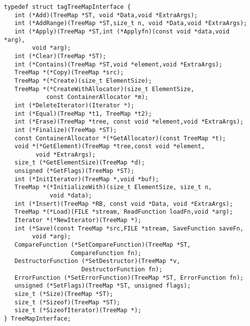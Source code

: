 \begin{verbatim}
typedef struct tagTreeMapInterface {
   int (*Add)(TreeMap *ST, void *Data,void *ExtraArgs); 
   int (*AddRange)(TreeMap *ST,size_t n, void *Data,void *ExtraArgs);
   int (*Apply)(TreeMap *ST,int (*Applyfn)(const void *data,void *arg),
        void *arg);
   int (*Clear)(TreeMap *ST); 
   int (*Contains)(TreeMap *ST,void *element,void *ExtraArgs);
   TreeMap *(*Copy)(TreeMap *src);
   TreeMap *(*Create)(size_t ElementSize);
   TreeMap *(*CreateWithAllocator)(size_t ElementSize,
            const ContainerAllocator *m);
   int (*DeleteIterator)(Iterator *);
   int (*Equal)(TreeMap *t1, TreeMap *t2);
   int (*Erase)(TreeMap *tree, const void *element,void *ExtraArgs); 
   int (*Finalize)(TreeMap *ST); 
   const ContainerAllocator *(*GetAllocator)(const TreeMap *t);
   void *(*GetElement)(TreeMap *tree,const void *element,
         void *ExtraArgs);
   size_t (*GetElementSize)(TreeMap *d);
   unsigned (*GetFlags)(TreeMap *ST); 
   int (*InitIterator)(TreeMap *,void *buf);
   TreeMap *(*InitializeWith)(size_t ElementSize, size_t n,
             void *data);
   int (*Insert)(TreeMap *RB, const void *Data, void *ExtraArgs);
   TreeMap *(*Load)(FILE *stream, ReadFunction loadFn,void *arg);
   Iterator *(*NewIterator)(TreeMap *);
   int (*Save)(const TreeMap *src,FILE *stream, SaveFunction saveFn,
        void *arg);
   CompareFunction (*SetCompareFunction)(TreeMap *ST,
                   CompareFunction fn);
   DestructorFunction (*SetDestructor)(TreeMap *v,
                      DestructorFunction fn);
   ErrorFunction (*SetErrorFunction)(TreeMap *ST, ErrorFunction fn);
   unsigned (*SetFlags)(TreeMap *ST, unsigned flags); 
   size_t (*Size)(TreeMap *ST); 
   size_t (*Sizeof)(TreeMap *ST);
   size_t (*SizeofIterator)(TreeMap *);
} TreeMapInterface;
\end{verbatim}
